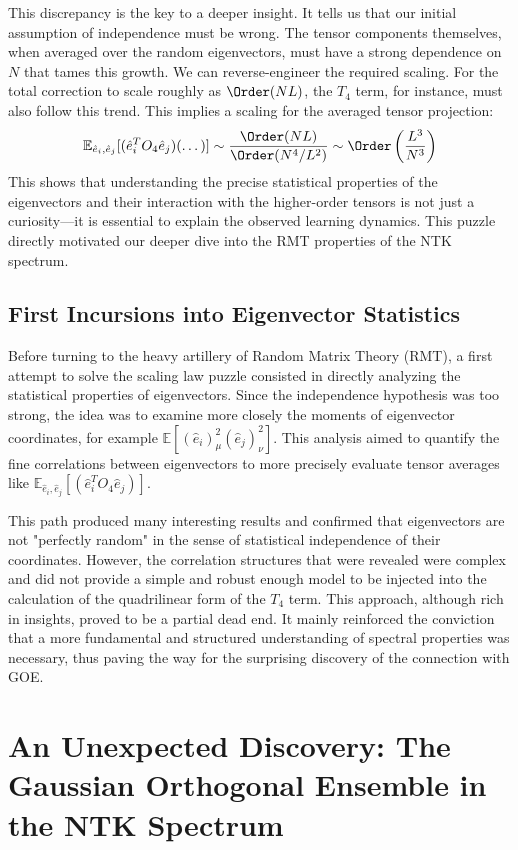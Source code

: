 \documentclass[a4paper]{article}
\begin{document}
This discrepancy is the key to a deeper insight. It tells us that our initial assumption of independence must be wrong. The tensor components themselves, when averaged over the random eigenvectors, must have a strong dependence on $N$ that tames this growth. We can reverse-engineer the required scaling. For the total correction to scale roughly as $\Order(NL)$, the $T_4$ term, for instance, must also follow this trend. This implies a scaling for the averaged tensor projection:
\[ \mathbb{E}_{\hat{e}_i, \hat{e}_j}[(\hat{e}_{i}^{T}O_{4}\hat{e}_{j})(\dots)] \sim \frac{\Order(NL)}{\Order(N^4/L^2)} \sim \Order\left(\frac{L^3}{N^3}\right) \]
This shows that understanding the precise statistical properties of the eigenvectors and their interaction with the higher-order tensors is not just a curiosity—it is essential to explain the observed learning dynamics. This puzzle directly motivated our deeper dive into the RMT properties of the NTK spectrum.

\subsection{First Incursions into Eigenvector Statistics}

Before turning to the heavy artillery of Random Matrix Theory (RMT), a first attempt to solve the scaling law puzzle consisted in directly analyzing the statistical properties of eigenvectors. Since the independence hypothesis was too strong, the idea was to examine more closely the moments of eigenvector coordinates, for example $\mathbb{E}[(\hat{e}_i)_\mu^2 (\hat{e}_j)_\nu^2]$. This analysis aimed to quantify the fine correlations between eigenvectors to more precisely evaluate tensor averages like $\mathbb{E}_{\hat{e}_i, \hat{e}_j}[(\hat{e}_{i}^{T}O_{4}\hat{e}_{j})]$.

This path produced many interesting results and confirmed that eigenvectors are not "perfectly random" in the sense of statistical independence of their coordinates. However, the correlation structures that were revealed were complex and did not provide a simple and robust enough model to be injected into the calculation of the quadrilinear form of the $T_4$ term. This approach, although rich in insights, proved to be a partial dead end. It mainly reinforced the conviction that a more fundamental and structured understanding of spectral properties was necessary, thus paving the way for the surprising discovery of the connection with GOE.

\newpage
\section{An Unexpected Discovery: The Gaussian Orthogonal Ensemble in the NTK Spectrum}
\end{document}

